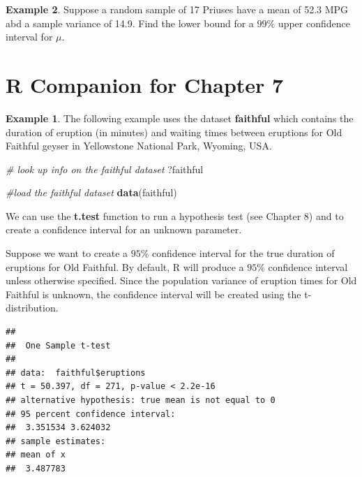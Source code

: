 \documentclass[
  11pt,
  oneside]{book}
\newenvironment{Shaded}{\begin{snugshade}}{\end{snugshade}}
\newcommand{\CommentTok}[1]{\textcolor[rgb]{0.56,0.35,0.01}{\textit{#1}}}
\newcommand{\FunctionTok}[1]{\textcolor[rgb]{0.13,0.29,0.53}{\textbf{#1}}}
\newcommand{\NormalTok}[1]{#1}
\newcommand{\SpecialCharTok}[1]{\textcolor[rgb]{0.81,0.36,0.00}{\textbf{#1}}}
\theoremstyle{definition}
\theoremstyle{definition}
\newtheorem{example}{Example}[chapter]
\theoremstyle{definition}
\theoremstyle{definition}
\theoremstyle{remark}
\begin{document}
\begin{example}

Suppose a random sample of 17 Priuses have a mean of 52.3 MPG abd a sample variance of 14.9. Find the lower bound for a \(99\%\) upper confidence interval for \(\mu\).

\newpage

\section{R Companion for Chapter 7}\label{r-companion-for-chapter-7}

\begin{example}
The following example uses the dataset \textbf{faithful} which contains the duration of eruption (in minutes) and waiting times between eruptions for Old Faithful geyser in Yellowstone National Park, Wyoming, USA.
\end{example}

\begin{Shaded}
\begin{Highlighting}[]
\CommentTok{\# look up info on the faithful dataset}
\NormalTok{?faithful}

\CommentTok{\#load the faithful dataset}
\FunctionTok{data}\NormalTok{(faithful)}
\end{Highlighting}
\end{Shaded}

We can use the \textbf{t.test} function to run a hypothesis test (see Chapter 8) and to create a confidence interval for an unknown parameter.

Suppose we want to create a \(95\%\) confidence interval for the true duration of eruptions for Old Faithful. By default, R will produce a \(95\%\) confidence interval unless otherwise specified. Since the population variance of eruption times for Old Faithful is unknown, the confidence interval will be created using the t-distribution.

\begin{Shaded}
\end{Shaded}

\begin{verbatim}
## 
##  One Sample t-test
## 
## data:  faithful$eruptions
## t = 50.397, df = 271, p-value < 2.2e-16
## alternative hypothesis: true mean is not equal to 0
## 95 percent confidence interval:
##  3.351534 3.624032
## sample estimates:
## mean of x 
##  3.487783
\end{verbatim}


\end{example}
\end{document}
